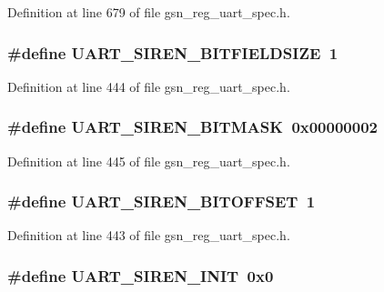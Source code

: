 Definition at line 679 of file gsn\_\-reg\_\-uart\_\-spec.h.

\hypertarget{a00575_aad3b5fd94f847cf193cc2b1ccf0f8233}{
\subsubsection[{UART\_\-SIREN\_\-BITFIELDSIZE}]{\setlength{\rightskip}{0pt plus 5cm}\#define UART\_\-SIREN\_\-BITFIELDSIZE~1}}
\label{a00575_aad3b5fd94f847cf193cc2b1ccf0f8233}


Definition at line 444 of file gsn\_\-reg\_\-uart\_\-spec.h.

\hypertarget{a00575_a112e0bf30867edb9556dc3d42c2c308f}{
\subsubsection[{UART\_\-SIREN\_\-BITMASK}]{\setlength{\rightskip}{0pt plus 5cm}\#define UART\_\-SIREN\_\-BITMASK~0x00000002}}
\label{a00575_a112e0bf30867edb9556dc3d42c2c308f}


Definition at line 445 of file gsn\_\-reg\_\-uart\_\-spec.h.

\hypertarget{a00575_a4991aebf1844c5d474e79346d5ad292f}{
\subsubsection[{UART\_\-SIREN\_\-BITOFFSET}]{\setlength{\rightskip}{0pt plus 5cm}\#define UART\_\-SIREN\_\-BITOFFSET~1}}
\label{a00575_a4991aebf1844c5d474e79346d5ad292f}


Definition at line 443 of file gsn\_\-reg\_\-uart\_\-spec.h.

\hypertarget{a00575_a76f9f18037c7a237887fddb1579e6a7b}{
\subsubsection[{UART\_\-SIREN\_\-INIT}]{\setlength{\rightskip}{0pt plus 5cm}\#define UART\_\-SIREN\_\-INIT~0x0}}
\label{a00575_a76f9f18037c7a237887fddb1579e6a7b}


